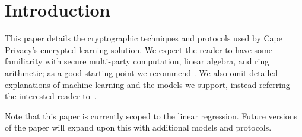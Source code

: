 
\section{Introduction}

This paper details the cryptographic techniques and protocols used by Cape Privacy's encrypted learning solution. We expect the reader to have some familiarity with secure multi-party computation, linear algebra, and ring arithmetic; as a good starting point we recommend \cite{evans2017pragmatic}. We also omit detailed explanations of machine learning and the models we support, instead referring the interested reader to~\cite{??}.

Note that this paper is currently scoped to the linear regression. Future versions of the paper will expand upon this with additional models and protocols.



